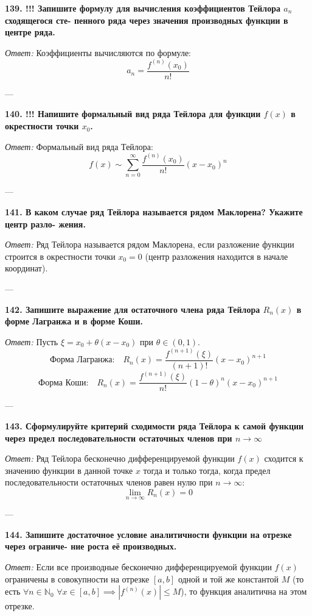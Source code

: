 \documentclass{article}
\begin{document}
\textbf{139. !!! Запишите формулу для вычисления коэффициентов Тейлора $a_{n}$ сходящегося сте- пенного ряда через значения производных функции в центре ряда.}

\textit{Ответ:} Коэффициенты вычисляются по формуле:
$$ a_n = \frac{f^{(n)}(x_0)}{n!} $$

---

\textbf{140. !!! Напишите формальный вид ряда Тейлора для функции $f(x)$ в окрестности точки $x_{0}$.}

\textit{Ответ:} Формальный вид ряда Тейлора:
$$ f(x) \sim \sum_{n=0}^{\infty} \frac{f^{(n)}(x_0)}{n!} (x - x_0)^n $$

---

\textbf{141. В каком случае ряд Тейлора называется рядом Маклорена? Укажите центр разло- жения.}

\textit{Ответ:} Ряд Тейлора называется рядом Маклорена, если разложение функции строится в окрестности точки $x_0 = 0$ (центр разложения находится в начале координат).

---

\textbf{142. Запишите выражение для остаточного члена ряда Тейлора $R_{n}(x)$ в форме Лагранжа и в форме Коши.}

\textit{Ответ:} Пусть $\xi = x_0 + \theta(x - x_0)$ при $\theta \in (0, 1)$.
$$ \text{Форма Лагранжа:} \quad R_n(x) = \frac{f^{(n+1)}(\xi)}{(n+1)!} (x - x_0)^{n+1} $$
$$ \text{Форма Коши:} \quad R_n(x) = \frac{f^{(n+1)}(\xi)}{n!} (1 - \theta)^n (x - x_0)^{n+1} $$

---

\textbf{143. Сформулируйте критерий сходимости ряда Тейлора к самой функции через предел последовательности остаточных членов при $n\rightarrow\infty$}

\textit{Ответ:} Ряд Тейлора бесконечно дифференцируемой функции $f(x)$ сходится к значению функции в данной точке $x$ тогда и только тогда, когда предел последовательности остаточных членов равен нулю при $n \to \infty$:
$$ \lim_{n \to \infty} R_n(x) = 0 $$

---

\textbf{144. Запишите достаточное условие аналитичности функции на отрезке через ограниче- ние роста её производных.}

\textit{Ответ:} Если все производные бесконечно дифференцируемой функции $f(x)$ ограничены в совокупности на отрезке $[a, b]$ одной и той же константой $M$ (то есть $\forall n \in \mathbb{N}_0 \,\, \forall x \in [a, b] \implies |f^{(n)}(x)| \le M$), то функция аналитична на этом отрезке.
\end{document}

